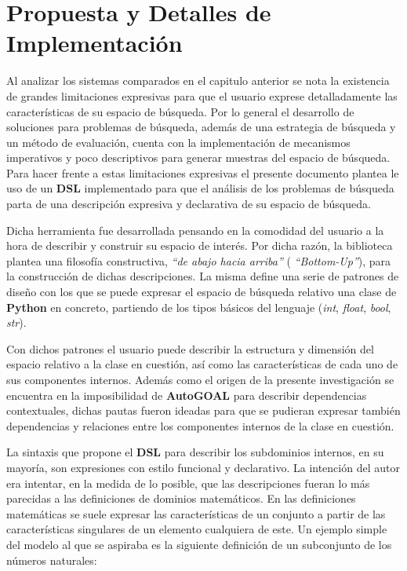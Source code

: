 \chapter{Propuesta y Detalles de Implementación}\label{chapter:proposal}

Al analizar los sistemas comparados en el capitulo anterior se nota la existencia
de grandes limitaciones expresivas para que el usuario exprese detalladamente las
características de su espacio de búsqueda. Por lo general el desarrollo de soluciones
para problemas de búsqueda, además de una estrategia de búsqueda y un método de evaluación,
cuenta con la implementación de mecanismos imperativos y poco descriptivos para generar
muestras del espacio de búsqueda. Para hacer frente a estas limitaciones expresivas
el presente documento plantea le uso de un {\bf DSL} implementado para que el análisis de
los problemas de búsqueda parta de una descripción expresiva y declarativa de su
espacio de búsqueda.

Dicha herramienta fue desarrollada pensando en la comodidad del usuario a la hora de
describir y construir su espacio de interés. Por dicha razón, la biblioteca plantea
una filosofía constructiva, {\it “de abajo hacia arriba”} ({ \it “Bottom-Up”}), para la
construcción de dichas descripciones. La misma define una serie de patrones de diseño
con los que se puede expresar el espacio de búsqueda relativo una clase de {\bf Python} en
concreto, partiendo de los tipos básicos del lenguaje ({\it int}, {\it float}, {\it bool},
{\it str}).

Con dichos patrones el usuario puede describir la estructura y dimensión del espacio
relativo a la clase en cuestión, así como las características de cada uno de sus
componentes internos. Además como el origen de la presente investigación se encuentra
en la imposibilidad de {\bf AutoGOAL} para describir dependencias contextuales, dichas pautas
fueron ideadas para que se pudieran expresar también dependencias y relaciones entre los
componentes internos de la clase en cuestión.

La sintaxis que propone el {\bf DSL} para describir los subdominios internos, en su mayoría,
son expresiones con estilo funcional y declarativo. La intención del autor era intentar,
en la medida de lo posible, que las descripciones fueran lo más parecidas a las definiciones
de dominios matemáticos. En las definiciones matemáticas se suele expresar las características
de un conjunto a partir de las características singulares de un elemento cualquiera de este.
Un ejemplo simple del modelo al que se aspiraba es la siguiente definición de un subconjunto de
los números naturales:

